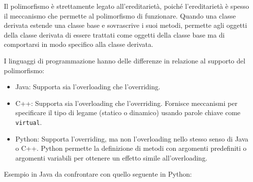 \documentclass[
  letterpaper,
]{scrbook}
\begin{document}
Il polimorfismo è strettamente legato all'ereditarietà, poiché
l'ereditarietà è spesso il meccanismo che permette al polimorfismo di
funzionare. Quando una classe derivata estende una classe base e
sovrascrive i suoi metodi, permette agli oggetti della classe derivata
di essere trattati come oggetti della classe base ma di comportarsi in
modo specifico alla classe derivata.

I linguaggi di programmazione hanno delle differenze in relazione al
supporto del polimorfismo:

\begin{itemize}
\item
  Java: Supporta sia l'overloading che l'overriding.
\item
  C++: Supporta sia l'overloading che l'overriding. Fornisce meccanismi
  per specificare il tipo di legame (statico o dinamico) usando parole
  chiave come \texttt{virtual}.
\item
  Python: Supporta l'overriding, ma non l'overloading nello stesso senso
  di Java o C++. Python permette la definizione di metodi con argomenti
  predefiniti o argomenti variabili per ottenere un effetto simile
  all'overloading.
\end{itemize}

Esempio in Java da confrontare con quello seguente in Python:
\end{document}
